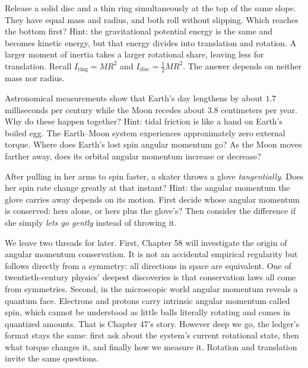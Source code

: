 \begin{puzzles}
\item Release a solid disc and a thin ring simultaneously at the top of the same slope. They have equal mass and radius, and both roll without slipping. Which reaches the bottom first? Hint: the gravitational potential energy is the same and becomes kinetic energy, but that energy divides into translation and rotation. A larger moment of inertia takes a larger rotational share, leaving less for translation. Recall \(I_{\text{ring}}=MR^2\) and \(I_{\text{disc}}=\tfrac12MR^2\). The answer depends on neither mass nor radius.
\item Astronomical measurements show that Earth's day lengthens by about \(1.7\) milliseconds per century while the Moon recedes about \(3.8\) centimeters per year. Why do these happen together? Hint: tidal friction is like a hand on Earth's boiled egg. The Earth--Moon system experiences approximately zero external torque. Where does Earth's lost spin angular momentum go? As the Moon moves farther away, does its orbital angular momentum increase or decrease?
\item After pulling in her arms to spin faster, a skater throws a glove \emph{tangentially}. Does her spin rate change greatly at that instant? Hint: the angular momentum the glove carries away depends on its motion. First decide whose angular momentum is conserved: hers alone, or hers plus the glove's? Then consider the difference if she simply \emph{lets go gently} instead of throwing it.
\end{puzzles}

We leave two threads for later. First, Chapter 58 will investigate the origin of angular momentum conservation. It is not an accidental empirical regularity but follows directly from a symmetry: all directions in space are equivalent. One of twentieth-century physics' deepest discoveries is that conservation laws all come from symmetries. Second, in the microscopic world angular momentum reveals a quantum face. Electrons and protons carry intrinsic angular momentum called spin, which cannot be understood as little balls literally rotating and comes in quantized amounts. That is Chapter 47's story. However deep we go, the ledger's format stays the same: first ask about the system's current rotational state, then what torque changes it, and finally how we measure it. Rotation and translation invite the same questions.
